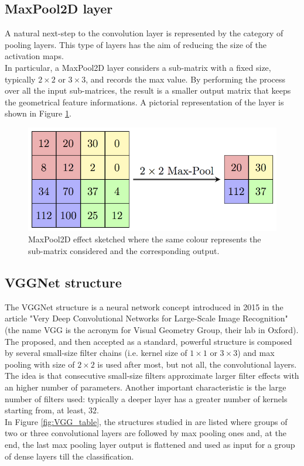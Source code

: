 \subsection*{MaxPool2D layer}
A natural next-step to the convolution layer is represented by the category of pooling layers. This type of layers has the aim of reducing the size of the activation maps.\\
In particular, a MaxPool2D layer considers a sub-matrix with a fixed size, typically $2\times2$ or $3\times3$, and records the max value. By performing the process over all the input sub-matrices, the result is a smaller output matrix that keeps the geometrical feature informations. A pictorial representation of the layer is shown in Figure \ref{fig:MaxPool}.

\begin{figure}[b]
	\centering
	\includegraphics[width=.6\textwidth]{IMG/Cap6/MaxpoolSample2.png}
	\caption{MaxPool2D effect sketched where the same colour represents the sub-matrix considered and the corresponding output.}
	\label{fig:MaxPool}
\end{figure}


\subsection*{VGGNet structure} \label{subsec:VGGNet_teo}
The VGGNet structure is a neural network concept introduced in 2015 in the article "Very Deep Convolutional Networks for Large-Scale Image Recognition" \cite{VGGArt} (the name VGG is the acronym for Visual Geometry Group, their lab in Oxford).\\
The proposed, and then accepted as a standard, powerful structure is composed by several small-size filter chains (i.e. kernel size of $1\times1$ or $3\times3$) and max pooling with size of $2\times2$ is used after most, but not all, the convolutional layers. The idea is that consecutive small-size filters approximate larger filter effects with an higher number of parameters. Another important characteristic is the large number of filters used: typically a deeper layer has a greater number of kernels starting from, at least, $32$.\\
In Figure \ref{fig:VGG_table}, the structures studied in \cite{VGGArt} are listed where groups of two or three convolutional layers are followed by max pooling ones and, at the end, the last max pooling layer output is flattened and used as input for a group of dense layers till the classification.\\

